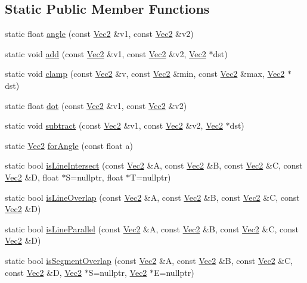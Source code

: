 \subsection*{Static Public Member Functions}
\begin{DoxyCompactItemize}
\item 
static float \hyperlink{classVec2_a8e791a6d3b657e714587295b6fc331b6}{angle} (const \hyperlink{classVec2}{Vec2} \&v1, const \hyperlink{classVec2}{Vec2} \&v2)
\item 
static void \hyperlink{classVec2_a6f16f084728b1beb09dc000a017b048b}{add} (const \hyperlink{classVec2}{Vec2} \&v1, const \hyperlink{classVec2}{Vec2} \&v2, \hyperlink{classVec2}{Vec2} $\ast$dst)
\item 
static void \hyperlink{classVec2_ab15d0c5365de52c4ee63a094448e1526}{clamp} (const \hyperlink{classVec2}{Vec2} \&v, const \hyperlink{classVec2}{Vec2} \&min, const \hyperlink{classVec2}{Vec2} \&max, \hyperlink{classVec2}{Vec2} $\ast$dst)
\item 
static float \hyperlink{classVec2_a399b823d9d25949b107850080a5f8653}{dot} (const \hyperlink{classVec2}{Vec2} \&v1, const \hyperlink{classVec2}{Vec2} \&v2)
\item 
static void \hyperlink{classVec2_a320e0720b043b46a2a921290167f1875}{subtract} (const \hyperlink{classVec2}{Vec2} \&v1, const \hyperlink{classVec2}{Vec2} \&v2, \hyperlink{classVec2}{Vec2} $\ast$dst)
\item 
static \hyperlink{classVec2}{Vec2} \hyperlink{classVec2_aba30a4b093635bdd1fa4e329e93455d9}{for\+Angle} (const float a)
\item 
static bool \hyperlink{classVec2_a04a88c3bcc6d5ecea1eaa75b59a62ae0}{is\+Line\+Intersect} (const \hyperlink{classVec2}{Vec2} \&A, const \hyperlink{classVec2}{Vec2} \&B, const \hyperlink{classVec2}{Vec2} \&C, const \hyperlink{classVec2}{Vec2} \&D, float $\ast$S=nullptr, float $\ast$T=nullptr)
\item 
static bool \hyperlink{classVec2_a658e44470389d83f72cfdf5c91718605}{is\+Line\+Overlap} (const \hyperlink{classVec2}{Vec2} \&A, const \hyperlink{classVec2}{Vec2} \&B, const \hyperlink{classVec2}{Vec2} \&C, const \hyperlink{classVec2}{Vec2} \&D)
\item 
static bool \hyperlink{classVec2_a2fba06dc07b152f9a2efd2687c257035}{is\+Line\+Parallel} (const \hyperlink{classVec2}{Vec2} \&A, const \hyperlink{classVec2}{Vec2} \&B, const \hyperlink{classVec2}{Vec2} \&C, const \hyperlink{classVec2}{Vec2} \&D)
\item 
static bool \hyperlink{classVec2_a99d2d2f5edf75476ba538ca19f2fb543}{is\+Segment\+Overlap} (const \hyperlink{classVec2}{Vec2} \&A, const \hyperlink{classVec2}{Vec2} \&B, const \hyperlink{classVec2}{Vec2} \&C, const \hyperlink{classVec2}{Vec2} \&D, \hyperlink{classVec2}{Vec2} $\ast$S=nullptr, \hyperlink{classVec2}{Vec2} $\ast$E=nullptr)

\end{DoxyCompactItemize}
